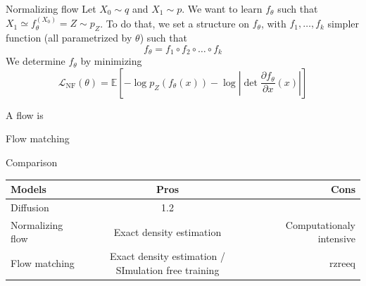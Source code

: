 \documentclass{beamer}
\begin{document}
\begin{frame}{Normalizing flow}
    Let \(X_0\sim q\) and \(X_1\sim p\). We want to learn \(f_\theta\) such that \(X_1 \simeq f_\theta^(X_0)=Z\sim p_Z\). To do that, we set a structure on \(f_\theta\), with \(f_1,\ldots,f_k\) simpler function (all parametrized by \(\theta\)) such that 
    \[f_\theta=f_1\circ f_2\circ\ldots\circ f_k\] 
    We determine \(f_\theta\) by minimizing 
    \[\mathcal{L}_\text{NF}(\theta)= \mathbb{E}\left[-\log p_Z(f_\theta(x))-\log \left|\det \frac{\partial f_\theta}{\partial x}(x)\right|\right]\]
\end{frame}

\begin{frame}
    A flow is 
\end{frame}

\begin{frame}{Flow matching}
    
\end{frame}



\begin{frame}{Comparison}
    \begin{tabular}{|l|c|r|}
        \hline
        Models & Pros & Cons \\
        \hline
        Diffusion & 1.2 &  \\
        Normalizing flow & Exact density estimation & Computationaly intensive \\ 
        Flow matching & Exact density estimation / SImulation free training  & rzreeq\\
        \hline
      \end{tabular}
    \end{frame}
\end{document}
